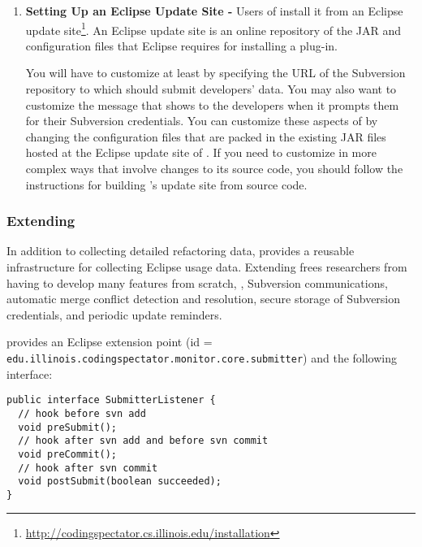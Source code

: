 \begin{enumerate}
\item
\textbf{Setting Up an Eclipse Update Site -}
Users of \CodingSpectator{} install it from an Eclipse update
site\footnote{\url{http://codingspectator.cs.illinois.edu/installation}}. An
Eclipse update site is an online repository of the JAR and configuration files
that Eclipse requires for installing a plug-in.

You will have to customize \CodingSpectator{} at least by specifying the URL of
the Subversion repository to which \CodingSpectator{} should submit developers' data.
You may also want to customize the message that \CodingSpectator{} shows to the
developers when it prompts them for their Subversion credentials. You can customize
these aspects of \CodingSpectator{} by changing the configuration files that are
packed in the existing JAR files hosted at the Eclipse update site of
\CodingSpectator. If you need to customize \CodingSpectator{} in more complex
ways that involve changes to its source code, you should follow the instructions
for building \CodingSpectator's update site from source code.
\end{enumerate}

\subsubsection{Extending \CodingSpectator}

In addition to collecting detailed refactoring data, \CodingSpectator{} provides
a reusable infrastructure for collecting Eclipse usage data. Extending
\CodingSpectator{} frees researchers from having to develop many features from
scratch, \eg, Subversion communications, automatic merge conflict detection and
resolution, secure storage of Subversion credentials, and periodic update
reminders.

\CodingSpectator{} provides an Eclipse extension point (id =
\texttt{edu.\-illinois.\-codingspectator.\-monitor.\-core.\-submitter}) and the
following interface:

\begin{lstlisting}
public interface SubmitterListener {
  // hook before svn add
  void preSubmit();
  // hook after svn add and before svn commit
  void preCommit();
  // hook after svn commit
  void postSubmit(boolean succeeded);
}
\end{lstlisting}

